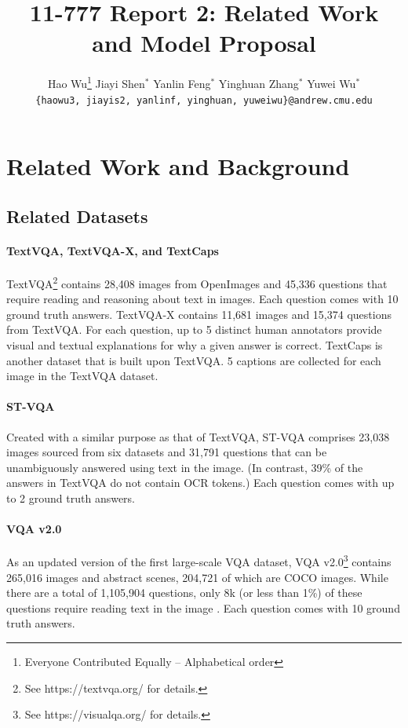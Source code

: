 \documentclass[11pt,a4paper]{article}
\title{11-777 Report 2: Related Work and Model Proposal}
\author{
  Hao Wu\thanks{\hspace{4pt}Everyone Contributed Equally -- Alphabetical order} \hspace{2em} Jiayi Shen$^*$ \hspace{2em} Yanlin Feng$^*$ \hspace{2em} Yinghuan Zhang$^*$ \hspace{2em} Yuwei Wu$^*$\\
  \texttt{\{haowu3, jiayis2, yanlinf, yinghuan, yuweiwu\}@andrew.cmu.edu}
  }
\date{}
\begin{document}
\maketitle
\section{Related Work and Background}
\subsection{Related Datasets}

\paragraph{TextVQA, TextVQA-X, and TextCaps} TextVQA\footnote{See https://textvqa.org/ for details.} contains 28,408 images from OpenImages and 45,336 questions that require reading and reasoning about text in images. Each question comes with 10 ground truth answers. TextVQA-X \cite{rao2021first} contains 11,681 images and 15,374 questions from TextVQA. For each question, up to 5 distinct human annotators provide visual and textual explanations for why a given answer is correct. TextCaps \cite{sidorov2020textcaps} is another dataset that is built upon TextVQA. 5 captions are collected for each image in the TextVQA dataset.

\paragraph{ST-VQA} Created with a similar purpose as that of TextVQA, ST-VQA \cite{biten2019scene} comprises 23,038 images sourced from six datasets and 31,791 questions that can be unambiguously answered using text in the image. (In contrast, 39\% of the answers in TextVQA do not contain OCR tokens.) Each question comes with up to 2 ground truth answers. 

\paragraph{VQA v2.0} As an updated version of the first large-scale VQA dataset, VQA v2.0\footnote{See https://visualqa.org/ for details.} contains 265,016 images and abstract scenes, 204,721 of which are COCO images. While there are a total of 1,105,904 questions, only 8k (or less than 1\%) of these questions require reading text in the image \cite{biten2019scene}. Each question comes with 10 ground truth answers.
\end{document}
